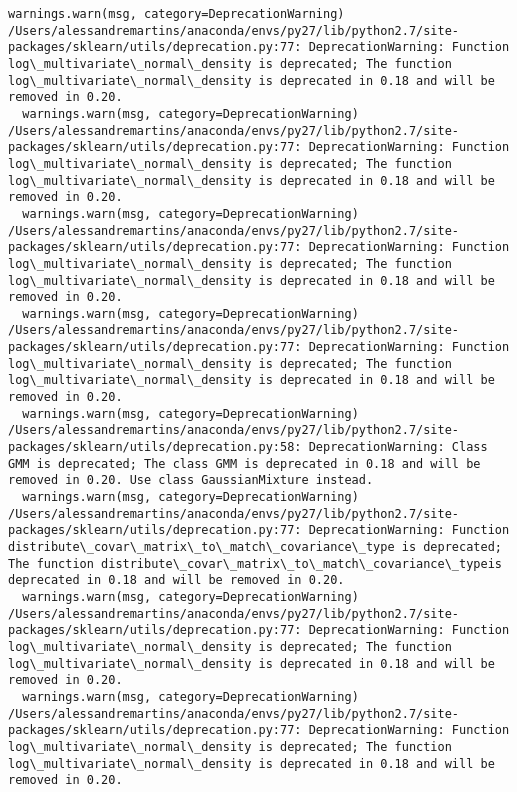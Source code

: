 \documentclass[11pt]{article}
\begin{document}
\begin{Verbatim}[commandchars=\\\{\}]
  warnings.warn(msg, category=DeprecationWarning)
/Users/alessandremartins/anaconda/envs/py27/lib/python2.7/site-packages/sklearn/utils/deprecation.py:77: DeprecationWarning: Function log\_multivariate\_normal\_density is deprecated; The function log\_multivariate\_normal\_density is deprecated in 0.18 and will be removed in 0.20.
  warnings.warn(msg, category=DeprecationWarning)
/Users/alessandremartins/anaconda/envs/py27/lib/python2.7/site-packages/sklearn/utils/deprecation.py:77: DeprecationWarning: Function log\_multivariate\_normal\_density is deprecated; The function log\_multivariate\_normal\_density is deprecated in 0.18 and will be removed in 0.20.
  warnings.warn(msg, category=DeprecationWarning)
/Users/alessandremartins/anaconda/envs/py27/lib/python2.7/site-packages/sklearn/utils/deprecation.py:77: DeprecationWarning: Function log\_multivariate\_normal\_density is deprecated; The function log\_multivariate\_normal\_density is deprecated in 0.18 and will be removed in 0.20.
  warnings.warn(msg, category=DeprecationWarning)
/Users/alessandremartins/anaconda/envs/py27/lib/python2.7/site-packages/sklearn/utils/deprecation.py:77: DeprecationWarning: Function log\_multivariate\_normal\_density is deprecated; The function log\_multivariate\_normal\_density is deprecated in 0.18 and will be removed in 0.20.
  warnings.warn(msg, category=DeprecationWarning)
/Users/alessandremartins/anaconda/envs/py27/lib/python2.7/site-packages/sklearn/utils/deprecation.py:58: DeprecationWarning: Class GMM is deprecated; The class GMM is deprecated in 0.18 and will be  removed in 0.20. Use class GaussianMixture instead.
  warnings.warn(msg, category=DeprecationWarning)
/Users/alessandremartins/anaconda/envs/py27/lib/python2.7/site-packages/sklearn/utils/deprecation.py:77: DeprecationWarning: Function distribute\_covar\_matrix\_to\_match\_covariance\_type is deprecated; The function distribute\_covar\_matrix\_to\_match\_covariance\_typeis deprecated in 0.18 and will be removed in 0.20.
  warnings.warn(msg, category=DeprecationWarning)
/Users/alessandremartins/anaconda/envs/py27/lib/python2.7/site-packages/sklearn/utils/deprecation.py:77: DeprecationWarning: Function log\_multivariate\_normal\_density is deprecated; The function log\_multivariate\_normal\_density is deprecated in 0.18 and will be removed in 0.20.
  warnings.warn(msg, category=DeprecationWarning)
/Users/alessandremartins/anaconda/envs/py27/lib/python2.7/site-packages/sklearn/utils/deprecation.py:77: DeprecationWarning: Function log\_multivariate\_normal\_density is deprecated; The function log\_multivariate\_normal\_density is deprecated in 0.18 and will be removed in 0.20.

\end{Verbatim}
\end{document}
